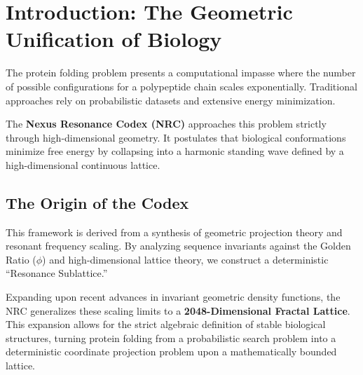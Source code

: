 \section{Introduction: The Geometric Unification of Biology}

The protein folding problem presents a computational impasse where the number of possible configurations for a polypeptide chain scales exponentially. Traditional approaches rely on probabilistic datasets and extensive energy minimization. 

The \textbf{Nexus Resonance Codex (NRC)} approaches this problem strictly through high-dimensional geometry. It postulates that biological conformations minimize free energy by collapsing into a harmonic standing wave defined by a high-dimensional continuous lattice.

\subsection{The Origin of the Codex}
This framework is derived from a synthesis of geometric projection theory and resonant frequency scaling. By analyzing sequence invariants against the Golden Ratio ($\phi$) and high-dimensional lattice theory, we construct a deterministic ``Resonance Sublattice.''

Expanding upon recent advances in invariant geometric density functions, the NRC generalizes these scaling limits to a \textbf{2048-Dimensional Fractal Lattice}. This expansion allows for the strict algebraic definition of stable biological structures, turning protein folding from a probabilistic search problem into a deterministic coordinate projection problem upon a mathematically bounded lattice.
